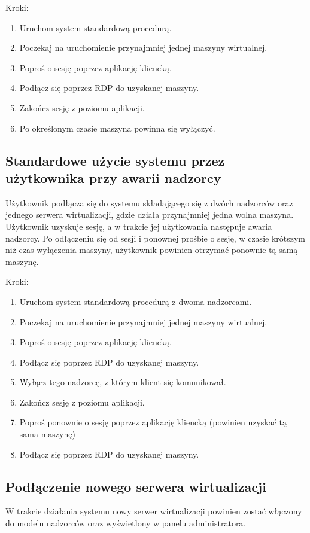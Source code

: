 \documentclass[../analiza-rozwiazania.tex]{subfiles}
\begin{document}
Kroki:
\begin{enumerate}
  \item Uruchom system standardową procedurą.
  \item Poczekaj na uruchomienie przynajmniej jednej maszyny wirtualnej.
  \item Poproś o sesję poprzez aplikację kliencką.
  \item Podłącz się poprzez RDP do uzyskanej maszyny.
  \item Zakończ sesję z poziomu aplikacji.
  \item Po określonym czasie maszyna powinna się wyłączyć.
\end{enumerate}

\subsection{Standardowe użycie systemu przez użytkownika przy awarii nadzorcy}
Użytkownik podłącza się do systemu składającego się z dwóch nadzorców oraz jednego serwera wirtualizacji, gdzie działa przynajmniej jedna wolna maszyna.
Użytkownik uzyskuje sesję, a w trakcie jej użytkowania następuje awaria nadzorcy.
Po odłączeniu się od sesji i ponownej prośbie o sesję, w czasie krótszym niż czas wyłączenia maszyny, użytkownik powinien otrzymać ponownie tą samą maszynę.

Kroki:
\begin{enumerate}
  \item Uruchom system standardową procedurą z dwoma nadzorcami.
  \item Poczekaj na uruchomienie przynajmniej jednej maszyny wirtualnej.
  \item Poproś o sesję poprzez aplikację kliencką.
  \item Podłącz się poprzez RDP do uzyskanej maszyny.
  \item Wyłącz tego nadzorcę, z którym klient się komunikował.
  \item Zakończ sesję z poziomu aplikacji.
  \item Poproś ponownie o sesję poprzez aplikację kliencką (powinien uzyskać tą sama maszynę)
  \item Podłącz się poprzez RDP do uzyskanej maszyny.
\end{enumerate}

\subsection{Podłączenie nowego serwera wirtualizacji}
W trakcie działania systemu nowy serwer wirtualizacji powinien zostać włączony do modelu nadzorców oraz wyświetlony w panelu administratora.
\end{document}
